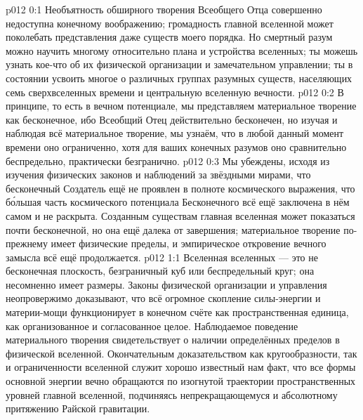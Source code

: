 \author{Совершенствователь Мудрости}
\vs p012 0:1 Необъятность обширного творения Всеобщего Отца совершенно недоступна конечному воображению; громадность главной вселенной может поколебать представления даже существ моего порядка. Но смертный разум можно научить многому относительно плана и устройства вселенных; ты можешь узнать кое\hyp{}что об их физической организации и замечательном управлении; ты в состоянии усвоить многое о различных группах разумных существ, населяющих семь сверхвселенных времени и центральную вселенную вечности.
\vs p012 0:2 В принципе, то есть в вечном потенциале, мы представляем материальное творение как бесконечное, ибо Всеобщий Отец действительно бесконечен, но изучая и наблюдая всё материальное творение, мы узнаём, что в любой данный момент времени оно ограниченно, хотя для ваших конечных разумов оно сравнительно беспредельно, практически безгранично.
\vs p012 0:3 Мы убеждены, исходя из изучения физических законов и наблюдений за звёздными мирами, что бесконечный Создатель ещё не проявлен в полноте космического выражения, что б\'ольшая часть космического потенциала Бесконечного всё ещё заключена в нём самом и не раскрыта. Созданным существам главная вселенная может показаться почти бесконечной, но она ещё далека от завершения; материальное творение по\hyp{}прежнему имеет физические пределы, и эмпирическое откровение вечного замысла всё ещё продолжается.
\vs p012 1:1 Вселенная вселенных --- это не бесконечная плоскость, безграничный куб или беспредельный круг; она несомненно имеет размеры. Законы физической организации и управления неопровержимо доказывают, что всё огромное скопление силы\hyp{}энергии и материи\hyp{}мощи функционирует в конечном счёте как пространственная единица, как организованное и согласованное целое. Наблюдаемое поведение материального творения свидетельствует о наличии определённых пределов в физической вселенной. Окончательным доказательством как кругообразности, так и ограниченности вселенной служит хорошо известный нам факт, что все формы основной энергии вечно обращаются по изогнутой траектории пространственных уровней главной вселенной, подчиняясь непрекращающемуся и абсолютному притяжению Райской гравитации.
